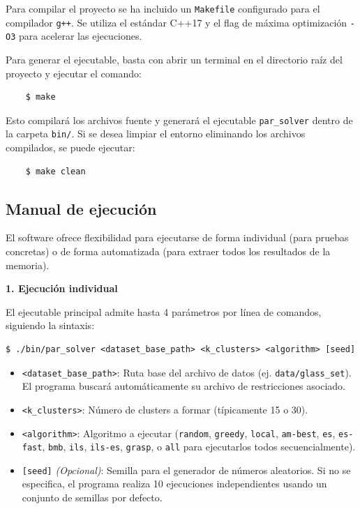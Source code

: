 \documentclass[a4paper,12pt]{article}%
\begin{document}
\noindent Para compilar el proyecto se ha incluido un \texttt{Makefile} configurado para el compilador \texttt{g++}. Se utiliza el estándar C++17 y el flag de máxima optimización \texttt{-O3} para acelerar las ejecuciones.

Para generar el ejecutable, basta con abrir un terminal en el directorio raíz del proyecto y ejecutar el comando:
\begin{verbatim}
	$ make
\end{verbatim}

Esto compilará los archivos fuente y generará el ejecutable \texttt{par\_solver} dentro de la carpeta \texttt{bin/}. Si se desea limpiar el entorno eliminando los archivos compilados, se puede ejecutar:
\begin{verbatim}
	$ make clean
\end{verbatim}

\subsection{Manual de ejecución}

\noindent El software ofrece flexibilidad para ejecutarse de forma individual (para pruebas concretas) o de forma automatizada (para extraer todos los resultados de la memoria).

\vspace{0.3cm}
\noindent\textbf{1. Ejecución individual}

El ejecutable principal admite hasta 4 parámetros por línea de comandos, siguiendo la sintaxis:
\begin{small}
\begin{verbatim}
$ ./bin/par_solver <dataset_base_path> <k_clusters> <algorithm> [seed]
\end{verbatim}
\end{small}


\begin{itemize}
	\item \texttt{<dataset\_base\_path>}: Ruta base del archivo de datos (ej. \texttt{data/glass\_set}). El programa buscará automáticamente su archivo de restricciones asociado.
	\item \texttt{<k\_clusters>}: Número de clusters a formar (típicamente 15 o 30).
	\item \texttt{<algorithm>}: Algoritmo a ejecutar (\texttt{random}, \texttt{greedy}, \texttt{local}, \texttt{am-best}, \texttt{es}, \texttt{es-fast}, \texttt{bmb}, \texttt{ils}, \texttt{ils-es}, \texttt{grasp}, o \texttt{all} para ejecutarlos todos secuencialmente).
	\item \texttt{[seed]} \textit{(Opcional)}: Semilla para el generador de números aleatorios. Si no se especifica, el programa realiza 10 ejecuciones independientes usando un conjunto de semillas por defecto.
\end{itemize}
\end{document}
